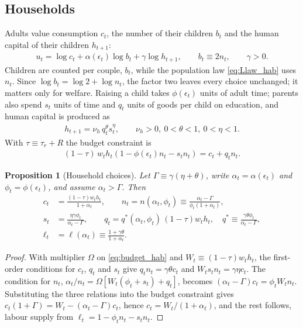 \documentclass[11pt]{article}
\newtheorem{proposition}{Proposition}
\begin{document}
\subsection{Households}
Adults value consumption $c_t$, the number of their children $b_t$ and the human capital of their
children $h_{t+1}$:
\begin{align}
u_t=\log c_t+\alpha(\epsilon_t)\log b_t+\gamma\log h_{t+1},\qquad b_t\equiv2n_t,\qquad \gamma>0 .
\label{eq:util_hab}
\end{align}
Children are counted per couple, $b_t$, while the population law \eqref{eq:Llaw_hab} uses $n_t$. Since
$\log b_t=\log2+\log n_t$, the factor two leaves every choice unchanged; it matters only for welfare.
Raising a child takes $\phi(\epsilon_t)$ units of adult time; parents also spend $s_t$ units of time and
$q_t$ units of goods per child on education, and human capital is produced as
\begin{align}
h_{t+1}=\nu_h\,q_t^{\theta}s_t^{\eta},\qquad \nu_h>0,\ 0<\theta<1,\ 0<\eta<1 .
\label{eq:hc_hab}
\end{align}
With $\tau\equiv\tau_r+R$ the budget constraint is
\begin{align}
(1-\tau)\,w_th_t\left(1-\phi(\epsilon_t)n_t-s_tn_t\right)=c_t+q_tn_t .
\label{eq:budget_hab}
\end{align}

\begin{proposition}[Household choices]
\label{prop:hab_solution}
Let $\Gamma\equiv\gamma(\eta+\theta)$, write $\alpha_t=\alpha(\epsilon_t)$ and $\phi_t=\phi(\epsilon_t)$, and
assume $\alpha_t>\Gamma$. Then
\begin{align}
c_t&=\frac{(1-\tau)w_th_t}{1+\alpha_t},
\qquad
n_t=n(\alpha_t,\phi_t)\equiv\frac{\alpha_t-\Gamma}{\phi_t(1+\alpha_t)},
\label{eq:sol_n_hab}\\
s_t&=\frac{\eta\gamma\phi_t}{\alpha_t-\Gamma},
\qquad
q_t=q^\ast(\alpha_t,\phi_t)\,(1-\tau)w_th_t,\quad q^\ast\equiv\frac{\gamma\theta\phi_t}{\alpha_t-\Gamma},
\label{eq:sol_q_hab}\\
\ell_t&=\ell(\alpha_t)\equiv\frac{1+\gamma\theta}{1+\alpha_t}.
\label{eq:sol_l_hab}
\end{align}
\end{proposition}

\begin{proof}
With multiplier $\Omega$ on \eqref{eq:budget_hab} and $W_t\equiv(1-\tau)w_th_t$, the first-order
conditions for $c_t$, $q_t$ and $s_t$ give $q_tn_t=\gamma\theta c_t$ and $W_ts_tn_t=\gamma\eta c_t$. The
condition for $n_t$, $\alpha_t/n_t=\Omega[W_t(\phi_t+s_t)+q_t]$, becomes
$(\alpha_t-\Gamma)c_t=\phi_tW_tn_t$. Substituting the three relations into the budget constraint gives
$c_t(1+\Gamma)=W_t-(\alpha_t-\Gamma)c_t$, hence $c_t=W_t/(1+\alpha_t)$, and the rest follows, labour
supply from $\ell_t=1-\phi_tn_t-s_tn_t$.
\end{proof}
\end{document}
